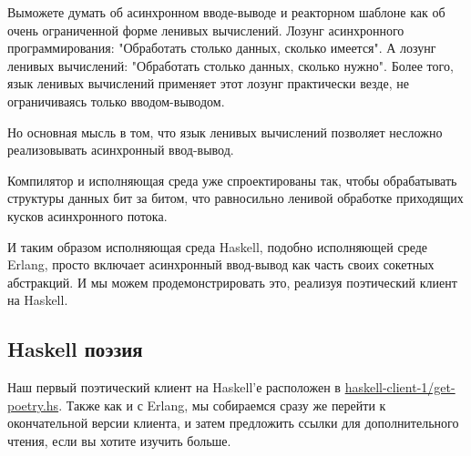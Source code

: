 Выможете думать об асинхронном вводе-выводе и 
реакторном шаблоне как об очень ограниченной 
форме ленивых вычислений. Лозунг асинхронного программирования: 
"Обработать столько данных, сколько имеется". А лозунг 
ленивых вычислений: "Обработать столько данных, сколько нужно". 
Более того, язык ленивых вычислений применяет этот лозунг 
практически везде, не ограничиваясь только вводом-выводом.


Но основная мысль в том, что язык ленивых вычислений позволяет 
несложно реализовывать асинхронный ввод-вывод. 

Компилятор и 
исполняющая среда уже спроектированы так, чтобы обрабатывать 
структуры данных бит за битом, что равносильно ленивой обработке  
приходящих кусков асинхронного потока. 


И таким образом исполняющая среда Haskell, подобно исполняющей 
среде Erlang, просто включает асинхронный ввод-вывод как часть 
своих сокетных абстракций. И мы можем продемонстрировать это, 
реализуя поэтический клиент на Haskell.


\subsection{Haskell поэзия}


Наш первый поэтический клиент на Haskell'е расположен в 
\href{https://github.com/jdavisp3/twisted-intro/blob/master/haskell-client-1/get-poetry.hs}{haskell-client-1/get-poetry.hs}. 
Также как и с Erlang, мы собираемся сразу же перейти к окончательной версии 
клиента, и затем предложить ссылки для дополнительного чтения, если вы 
хотите изучить больше.


